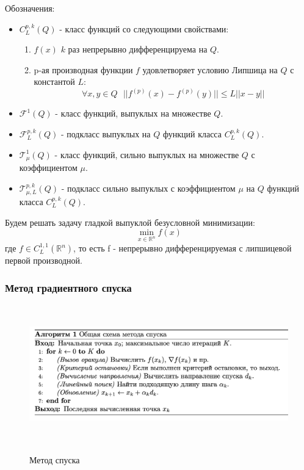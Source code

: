 Обозначения:
\begin{itemize}
    \item $C_L^{p,k} (Q)$ - класс функций со следующими свойствами:
    \begin{enumerate}
        \item $f(x)$ $k$ раз непрерывно дифференцируема на $Q$.
        \item  p-ая производная функции $f$ удовлетворяет условию Липшица на $Q$ с константой $L$:
        $$\forall x, y \in Q \text{ } ||f^{(p)}(x) - f^{(p)}(y)|| \leqslant L||x-y||$$
    \end{enumerate}
    \item $\mathscr{F}^1(Q)$ -
    класс функций, выпуклых на множестве $Q$.
    \item $\mathscr{F}_L^{p,k}(Q)$ -
    подкласс выпуклых на $Q$ функций
    класса
    $C_L^{p,k} (Q)$.
    \item $\mathscr{T}_{\mu}^{1} (Q)$ -
    класс функций, сильно выпуклых на множестве $Q$ с коэффициентом $\mu$.
    \item $\mathscr{T}_{\mu, L}^{p,k}(Q)$ -
    подкласс  сильно выпуклых  с коэффициентом $\mu$ на $Q$ функций
    класса
    $C_L^{p,k} (Q)$.

\end{itemize}

Будем решать задачу гладкой выпуклой безусловной минимизации:
\begin{equation*}
    \min\limits_{x \in \mathbb{R}^n} f(x)
\end{equation*}
где
$f \in C_L^{1,1}(\mathbb{R}^n)$,
то есть f - непрерывно дифференцируемая  с липшицевой первой производной.

\subsubsection{Метод градиентного спуска}

\begin{figure}[H]
            \centering
            \includegraphics[width=16cm, height=6cm]{images/2-3-grad.png}
            \label{ris:im225}
            \caption{Метод спуска}
        \end{figure}

